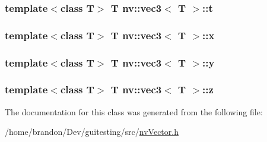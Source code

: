 \hypertarget{classnv_1_1vec3_627872f6520734193bb67a93c2b4c77a}{
\subsubsection[{t}]{\setlength{\rightskip}{0pt plus 5cm}template$<$class T$>$ T {\bf nv::vec3}$<$ T $>$::{\bf t}}}
\label{classnv_1_1vec3_627872f6520734193bb67a93c2b4c77a}


\hypertarget{classnv_1_1vec3_6a5c82f6f2eda9b003522b1eb049d8e5}{
\subsubsection[{x}]{\setlength{\rightskip}{0pt plus 5cm}template$<$class T$>$ T {\bf nv::vec3}$<$ T $>$::{\bf x}}}
\label{classnv_1_1vec3_6a5c82f6f2eda9b003522b1eb049d8e5}


\hypertarget{classnv_1_1vec3_74dbe5f66d5a3201625444b5f0d7d290}{
\subsubsection[{y}]{\setlength{\rightskip}{0pt plus 5cm}template$<$class T$>$ T {\bf nv::vec3}$<$ T $>$::{\bf y}}}
\label{classnv_1_1vec3_74dbe5f66d5a3201625444b5f0d7d290}


\hypertarget{classnv_1_1vec3_b8b7f9954c952e359ded3238ab618dae}{
\subsubsection[{z}]{\setlength{\rightskip}{0pt plus 5cm}template$<$class T$>$ T {\bf nv::vec3}$<$ T $>$::{\bf z}}}
\label{classnv_1_1vec3_b8b7f9954c952e359ded3238ab618dae}




The documentation for this class was generated from the following file:\begin{CompactItemize}
\item 
/home/brandon/Dev/guitesting/src/\hyperlink{nv_vector_8h}{nvVector.h}\end{CompactItemize}
